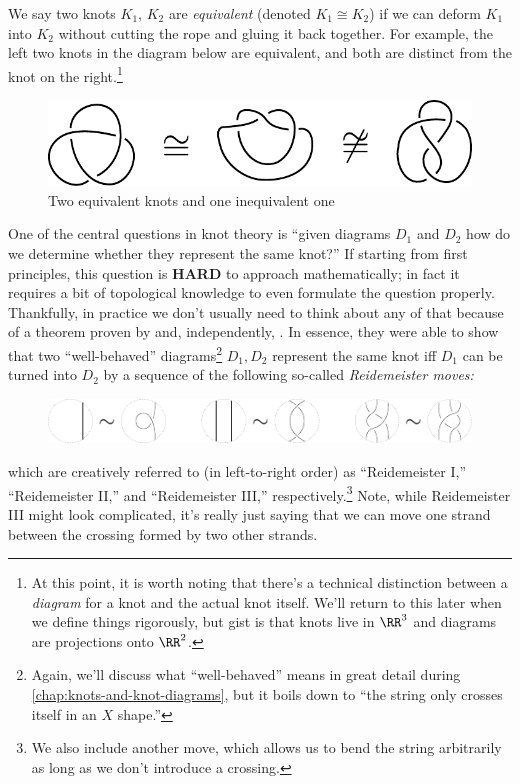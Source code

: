 We say two knots $K_1$, $K_2$ are \emph{equivalent} (denoted $K_1
\cong K_2$) if we can deform $K_1$ into $K_2$ without cutting the rope
and gluing it back together. For example, the left two knots in the
diagram below are equivalent, and both are distinct from the knot on
the right.\footnote{At this point, it is worth noting that there's a
  technical distinction between a \emph{diagram} for a knot and the
  actual knot itself. We'll return to this later when we define things
  rigorously, but gist is that knots live in $\RR^3$ and diagrams are
  projections onto $\RR^2$.}
\begin{figure}[H]
  \centering
  \includegraphics[width=.5\linewidth]{figures/intro/three-knots.pdf}
  \caption{Two equivalent knots and one inequivalent one}
\end{figure}
One of the central questions in knot theory is ``given diagrams $D_1$
and $D_2$ how do we determine whether they represent the same knot?''
If starting from first principles, this question is \textbf{HARD} to
approach mathematically; in fact it requires a bit of topological
knowledge to even formulate the question properly. Thankfully, in
practice we don't usually need to think about any of that because of a
theorem proven by \cite{Reidemeister1927Dec} and, independently,
\cite{Alexander1926}. In essence, they were able to show that two
``well-behaved'' diagrams\footnote{Again, we'll discuss what
  ``well-behaved'' means in great detail during
  \cref{chap:knots-and-knot-diagrams}, but it boils down to ``the
  string only crosses itself in an $X$ shape.''} $D_1, D_2$ represent
the same knot iff $D_1$ can be turned into $D_2$ by a sequence of the
following so-called \emph{Reidemeister moves:}
\begin{figure}[H]
  \centering
  \includegraphics[width=12cm]{figures/intro/rmoves.pdf}
\end{figure}
\noindent%
which are creatively referred to (in left-to-right order) as
``Reidemeister I,'' ``Reidemeister II,'' and ``Reidemeister III,''
respectively.\footnote{We also include another move, which allows us
  to bend the string arbitrarily as long as we don't introduce a
  crossing.} Note, while Reidemeister III might look complicated, it's
really just saying that we can move one strand between the crossing
formed by two other strands.

